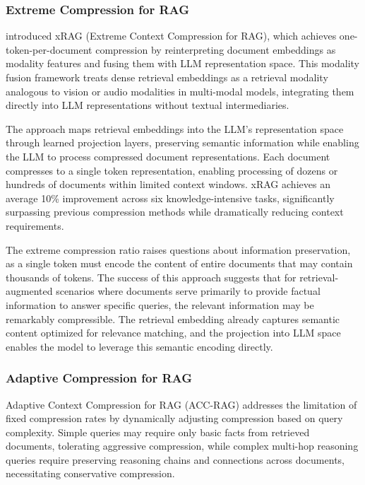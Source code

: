 \documentclass[11pt,letterpaper]{article}
\begin{document}
\subsubsection{Extreme Compression for RAG}

\cite{xrag2024} introduced xRAG (Extreme Context Compression for RAG), which achieves one-token-per-document compression by reinterpreting document embeddings as modality features and fusing them with LLM representation space. This modality fusion framework treats dense retrieval embeddings as a retrieval modality analogous to vision or audio modalities in multi-modal models, integrating them directly into LLM representations without textual intermediaries.

The approach maps retrieval embeddings into the LLM's representation space through learned projection layers, preserving semantic information while enabling the LLM to process compressed document representations. Each document compresses to a single token representation, enabling processing of dozens or hundreds of documents within limited context windows. xRAG achieves an average 10\% improvement across six knowledge-intensive tasks, significantly surpassing previous compression methods while dramatically reducing context requirements.

The extreme compression ratio raises questions about information preservation, as a single token must encode the content of entire documents that may contain thousands of tokens. The success of this approach suggests that for retrieval-augmented scenarios where documents serve primarily to provide factual information to answer specific queries, the relevant information may be remarkably compressible. The retrieval embedding already captures semantic content optimized for relevance matching, and the projection into LLM space enables the model to leverage this semantic encoding directly.

\subsubsection{Adaptive Compression for RAG}

Adaptive Context Compression for RAG (ACC-RAG) addresses the limitation of fixed compression rates by dynamically adjusting compression based on query complexity. Simple queries may require only basic facts from retrieved documents, tolerating aggressive compression, while complex multi-hop reasoning queries require preserving reasoning chains and connections across documents, necessitating conservative compression.
\end{document}
